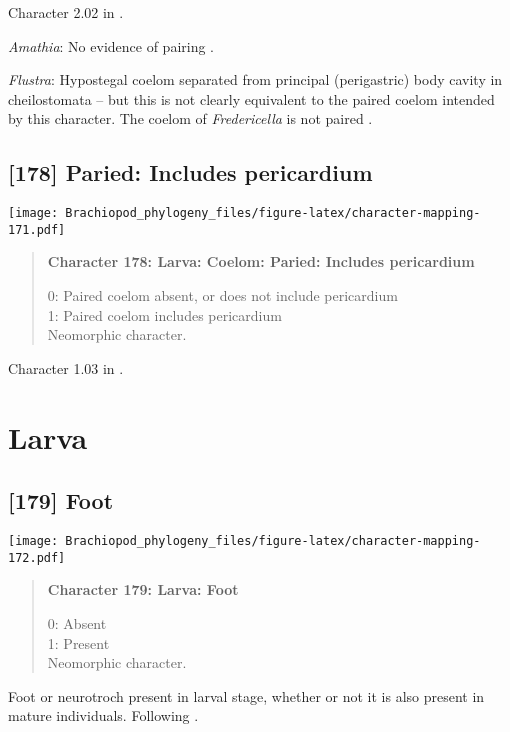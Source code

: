 \documentclass[openany]{book}
\theoremstyle{definition}
\theoremstyle{definition}
\theoremstyle{definition}
\theoremstyle{remark}
\begin{document}
Character 2.02 in \citet{Scheltema1993}.

\hypertarget{Amathia-coding-177}{}
\emph{Amathia}: No evidence of pairing \citep{Reed1982}.

\hypertarget{Flustra-coding-177}{}
\emph{Flustra}: Hypostegal coelom separated from principal (perigastric)
body cavity in cheilostomata -- but this is not clearly equivalent to
the paired coelom intended by this character. The coelom of
\emph{Fredericella} is not paired \citep{Gruhl2010F}.

\subsection*{{[}178{]} Paried: Includes
pericardium}\label{paried-includes-pericardium}

\texttt{[image: Brachiopod\_phylogeny\_files/figure-latex/character-mapping-171.pdf]}

\begin{quote}
\textbf{Character 178: Larva: Coelom: Paried: Includes pericardium}

0: Paired coelom absent, or does not include pericardium\\
1: Paired coelom includes pericardium\\
Neomorphic character.
\end{quote}

Character 1.03 in \citet{Scheltema1993}.

\section{Larva}\label{larva-1}

\subsection*{{[}179{]} Foot}\label{foot-1}

\texttt{[image: Brachiopod\_phylogeny\_files/figure-latex/character-mapping-172.pdf]}

\begin{quote}
\textbf{Character 179: Larva: Foot}

0: Absent\\
1: Present\\
Neomorphic character.
\end{quote}

Foot or neurotroch present in larval stage, whether or not it is also
present in mature individuals. Following \citet{Wingstrand1985}.
\end{document}
